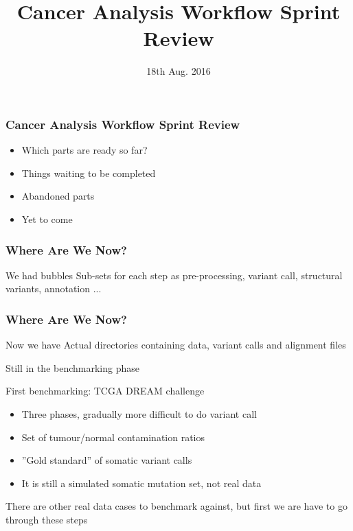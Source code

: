 \documentclass{beamer}
\title{Cancer Analysis Workflow Sprint Review}
\institute{SciLifeLab}
\date{18th Aug. 2016 }
\begin{document}
\frame{\titlepage}
			  
\begin{frame}
\frametitle{Cancer Analysis Workflow Sprint Review}
\begin{itemize}
	\item Which parts are ready so far?
	\item Things waiting to be completed
	\item Abandoned parts
	\item Yet to come
\end{itemize}
\end{frame}

\begin{frame}
\frametitle{Where Are We Now?}
\begin{block}{We had bubbles}
Sub-sets for each step as pre-processing, variant call, structural variants, annotation ...
\end{block}
\end{frame}

\begin{frame}
\frametitle{Where Are We Now?}
\begin{block}{Now we have}
	Actual directories containing data, variant calls and alignment files

	Still in the benchmarking phase
\end{block}
\begin{block}{First benchmarking: TCGA DREAM challenge}
	\begin{itemize}
		\item Three phases, gradually more difficult to do variant call
		\item Set of tumour/normal contamination ratios
		\item ''Gold standard'' of somatic variant calls
		\item It is still a simulated somatic mutation set, not real data
	\end{itemize}
\end{block}
There are other real data cases to benchmark against, but first we are have to go through these steps
\end{frame}
\end{document}
